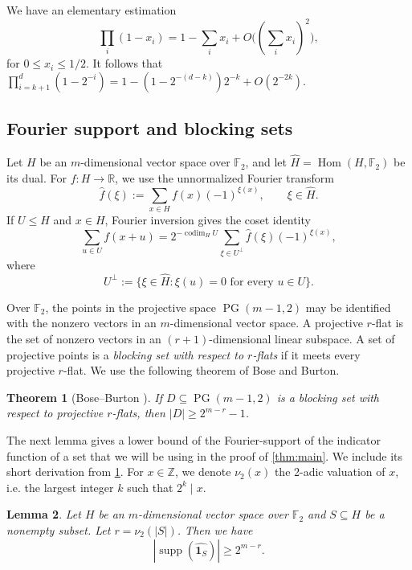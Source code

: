 \documentclass[reqno]{amsart}
\newtheorem{theorem}{Theorem}[section]
\newtheorem{lemma}[theorem]{Lemma}
\theoremstyle{definition}
\theoremstyle{remark}
\newcommand{\F}{\mathbb F}
\newcommand{\R}{\mathbb R}
\newcommand{\one}{\mathbf 1}
\DeclareMathOperator{\supp}{supp}
\DeclareMathOperator{\codim}{codim}
\begin{document}
We have an elementary estimation
\[
\prod_i(1-x_i)=1-\sum_i x_i+O\biggl(\left(\sum_i x_i\right)^2\biggr),
\]
for $0\le x_i\le1/2$. It follows that $\prod_{i = k+1}^d(1-2^{-i}) = 1- (1-2^{-(d-k)})2^{-k} + O(2^{-2k})$. 


\subsection{Fourier support and blocking sets}

Let $H$ be an $m$-dimensional vector space over $\F_2$, and let
$\widehat H=\operatorname{Hom}(H,\F_2)$ be its dual.  For
$f:H\to\R$, we use the unnormalized Fourier transform
\[
  \widehat f(\xi):=\sum_{x\in H}f(x)(-1)^{\xi(x)},
  \qquad \xi\in\widehat H.
\]
If $U\le H$ and $x\in H$, Fourier inversion gives the coset identity
\begin{equation}\label{eq:coset-fourier}
  \sum_{u\in U}f(x+u)
  =2^{-\codim_H U}
    \sum_{\xi\in U^\perp}\widehat f(\xi)(-1)^{\xi(x)},
\end{equation}
where
\[
  U^\perp:=\{\xi\in\widehat H:\xi(u)=0\text{ for every }u\in U\}.
\]

Over $\F_2$, the points in the projective space $\operatorname{PG}(m-1,2)$
may be identified with the nonzero vectors in an $m$-dimensional vector
space.  A projective $r$-flat is the set of nonzero vectors in an
$(r+1)$-dimensional linear subspace.  A set of projective points is a
\emph{blocking set with respect to $r$-flats} if it meets every
projective $r$-flat.  We use the following theorem of Bose and Burton.

\begin{theorem}[Bose--Burton \cite{BoseBurton1966}]\label{thm:bose-burton}
If $D\subseteq\operatorname{PG}(m-1,2)$ is a blocking set with respect
to projective $r$-flats, then $|D|\ge2^{m-r}-1$.
\end{theorem}

The next lemma gives a lower bound of the Fourier-support of the indicator function of a set that we will be using in the proof of \cref{thm:main}.  We include its short derivation from \cref{thm:bose-burton}. For $x \in \mathbb Z$, we denote $\nu_2(x)$ the 2-adic valuation of $x$, i.e. the largest integer $k$ such that $2^k\mid x$.

\begin{lemma}\label{lem:2adic-support}
Let $H$ be an $m$-dimensional vector space over $\F_2$ and $S\subseteq H$ be a nonempty subset. Let $r=\nu_2(|S|)$.  Then we have
\[
  |\supp(\widehat{\one_S})|\ge2^{m-r}.
\]
\end{lemma}
\end{document}
